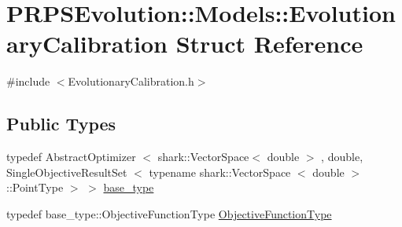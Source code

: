 \hypertarget{struct_p_r_p_s_evolution_1_1_models_1_1_evolutionary_calibration}{\section{\-P\-R\-P\-S\-Evolution\-:\-:\-Models\-:\-:\-Evolutionary\-Calibration \-Struct \-Reference}
\label{struct_p_r_p_s_evolution_1_1_models_1_1_evolutionary_calibration}
}


{\ttfamily \#include $<$\-Evolutionary\-Calibration.\-h$>$}

\subsection*{\-Public \-Types}
\begin{DoxyCompactItemize}
\item 
typedef \-Abstract\-Optimizer\*
$<$ shark\-::\-Vector\-Space$<$ double $>$\*
, double, \*
\-Single\-Objective\-Result\-Set\*
$<$ typename shark\-::\-Vector\-Space\*
$<$ double $>$\-::\-Point\-Type $>$ $>$ \hyperlink{struct_p_r_p_s_evolution_1_1_models_1_1_evolutionary_calibration_aa7969f9a9c8eda5919cac2a20344151f}{base\-\_\-type}
\item 
typedef \*
base\-\_\-type\-::\-Objective\-Function\-Type \hyperlink{struct_p_r_p_s_evolution_1_1_models_1_1_evolutionary_calibration_a591c286e6ffdb08ea30590f82b63b1f2}{\-Objective\-Function\-Type}
\end{DoxyCompactItemize}
